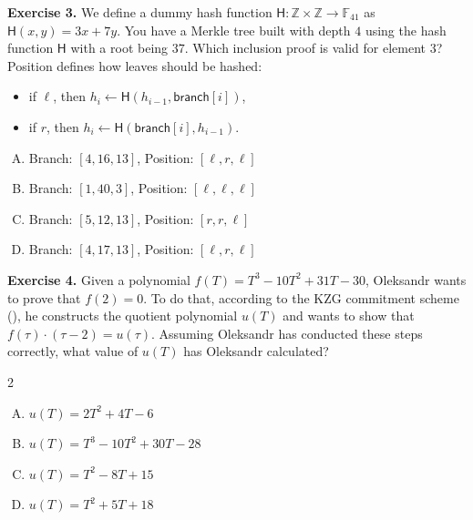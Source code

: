 \documentclass[../../book]{subfiles}
\begin{document}
\textbf{Exercise 3.} We define a dummy hash function $\mathsf{H}: \mathbb{Z} \times
\mathbb{Z} \to \mathbb{F}_{41}$ as $\mathsf{H}(x, y) = 3x+7y$. You have a Merkle tree
built with depth $4$ using the hash function $\mathsf{H}$ with a root being $37$.
Which inclusion proof is valid for element $3$? Position defines how leaves
should be hashed:
\begin{itemize}
    \item if $\ell$, then $h_i \gets \mathsf{H}(h_{i-1}, \mathsf{branch}[i])$,
    \item if $r$, then $h_i \gets \mathsf{H}(\mathsf{branch}[i], h_{i-1})$.
\end{itemize}
\begin{enumerate}[(A)]
    \item Branch: $[4, 16, 13]$, Position: $[\ell,r,\ell]$
    \item Branch: $[1, 40, 3]$, Position: $[\ell, \ell, \ell]$
    \item Branch: $[5, 12, 13]$, Position: $[r, r, \ell]$
    \item Branch: $[4, 17, 13]$, Position: $[\ell, r, \ell]$
\end{enumerate}

\textbf{Exercise 4.} Given a polynomial $f(T) = T^3 - 10T^2 + 31T - 30$, Oleksandr wants to prove that $f(2)=0$. 
To do that, according to the KZG commitment scheme (), he constructs the quotient polynomial $u(T)$ and wants 
to show that $f(\tau) \cdot (\tau - 2) = u(\tau)$. Assuming Oleksandr has conducted these steps correctly, 
what value of $u(T)$ has Oleksandr calculated?

\vspace{-3mm}

\begin{multicols}{2}
    \begin{enumerate}[(A)]
        \item $u(T) = 2T^2 + 4T - 6$
        \item $u(T) = T^3 - 10T^2 + 30T - 28$
        \item $u(T) = T^2 - 8T + 15$
        \item $u(T) = T^2 + 5T + 18$
    \end{enumerate}
\end{multicols}
\end{document}
